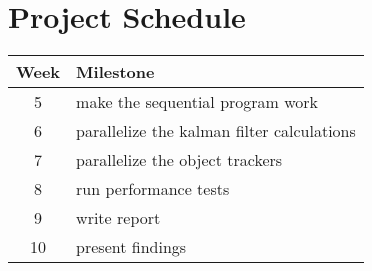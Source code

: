 \chapter*{Project Schedule}

\begin{tabular}{c | l}
Week & Milestone\\
\hline
5 & make the sequential program work\\
6 & parallelize the kalman filter calculations\\
7 & parallelize the object trackers\\
8 & run performance tests\\
9 & write report\\
10 & present findings\\
\end{tabular}
